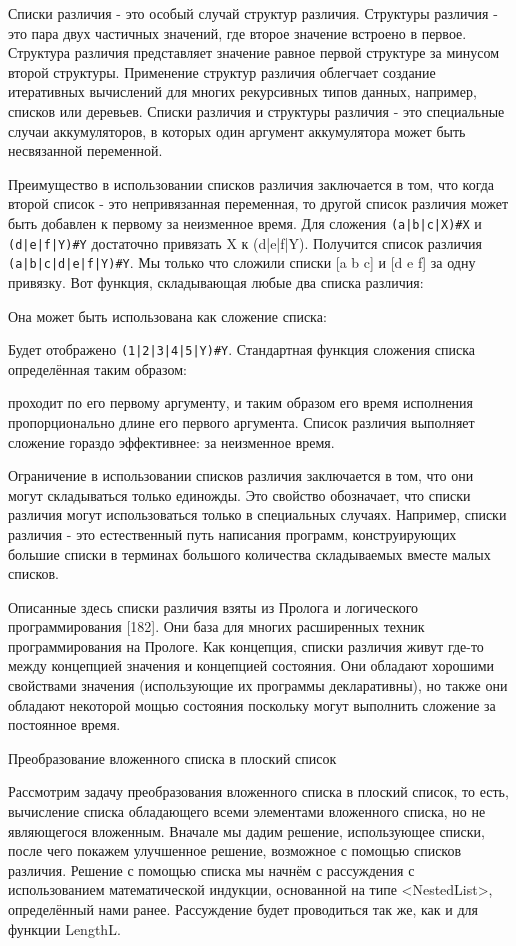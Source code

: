 Списки различия - это особый случай структур различия. Структуры различия - это пара двух частичных значений, где второе значение встроено в первое. Структура различия представляет значение равное первой структуре за минусом второй структуры. Применение структур различия облегчает создание итеративных вычислений для многих рекурсивных типов данных, например, списков или деревьев. Списки различия и структуры различия - это специальные случаи аккумуляторов, в которых один аргумент аккумулятора может быть несвязанной переменной.

Преимущество в использовании списков различия заключается в том, что когда второй список - это непривязанная переменная, то другой список различия может быть добавлен к первому за неизменное время. Для сложения \verb!(a|b|c|X)#X! и \verb!(d|e|f|Y)#Y! достаточно привязать X к (d|e|f|Y). Получится список различия \verb!(a|b|c|d|e|f|Y)#Y!. Мы только что сложили списки [a b c] и [d e f] за одну привязку. Вот функция, складывающая любые два списка различия:

Она может быть использована как сложение списка:

Будет отображено \verb!(1|2|3|4|5|Y)#Y!. Стандартная функция сложения списка определённая таким образом:

проходит по его первому аргументу, и таким образом его время исполнения пропорционально длине его первого аргумента. Список различия выполняет сложение гораздо эффективнее: за неизменное время.

Ограничение в использовании списков различия заключается в том, что они могут складываться только единожды. Это свойство обозначает, что списки различия могут использоваться только в специальных случаях. Например, списки различия - это естественный путь написания программ, конструирующих большие списки в терминах большого количества складываемых вместе малых списков.

Описанные здесь списки различия взяты из Пролога и логического программирования [182]. Они база для многих расширенных техник программирования на Прологе. Как концепция, списки различия живут где-то между концепцией значения и концепцией состояния. Они обладают хорошими свойствами значения (использующие их программы декларативны), но также они обладают некоторой мощью состояния поскольку могут выполнить сложение за постоянное время.

Преобразование вложенного списка в плоский список

Рассмотрим задачу преобразования вложенного списка в плоский список, то есть, вычисление списка обладающего всеми элементами вложенного списка, но не являющегося вложенным. Вначале мы дадим решение, использующее списки, после чего покажем улучшенное решение, возможное с помощью списков различия. Решение с помощью списка мы начнём с рассуждения с использованием математической индукции, основанной на типе <NestedList>, определённый нами ранее. Рассуждение будет проводиться так же, как и для функции LengthL.

